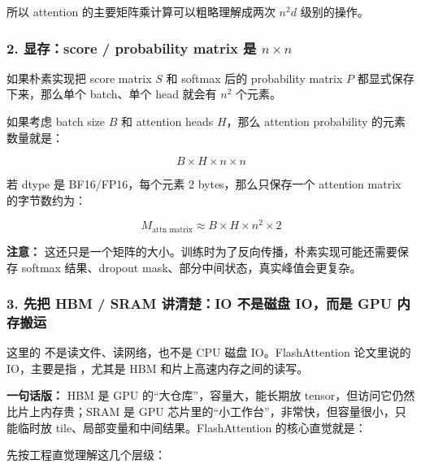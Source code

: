 所以 attention 的主要矩阵乘计算可以粗略理解成两次 $n^2d$ 级别的操作。

\subsubsection*{2. 显存：score / probability matrix 是 $n \times n$}

如果朴素实现把 score matrix $S$ 和 softmax 后的 probability matrix $P$ 都显式保存下来，那么单个 batch、单个 head 就会有 $n^2$ 个元素。

如果考虑 batch size $B$ 和 attention heads $H$，那么 attention probability 的元素数量就是：

\[
B \times H \times n \times n
\]

若 dtype 是 BF16/FP16，每个元素 2 bytes，那么只保存一个 attention matrix 的字节数约为：

\[
M_{\text{attn matrix}}
\approx
B \times H \times n^2 \times 2
\]

\begin{warnbox}
\textbf{注意：} 这还只是一个矩阵的大小。训练时为了反向传播，朴素实现可能还需要保存 softmax 结果、dropout mask、部分中间状态，真实峰值会更复杂。
\end{warnbox}

\subsubsection*{3. 先把 HBM / SRAM 讲清楚：IO 不是磁盘 IO，而是 GPU 内存搬运}

这里的  不是读文件、读网络，也不是 CPU 磁盘 IO。FlashAttention 论文里说的 IO，主要是指 ，尤其是 HBM 和片上高速内存之间的读写。

\begin{conceptbox}
\textbf{一句话版：} HBM 是 GPU 的“大仓库”，容量大，能长期放 tensor，但访问它仍然比片上内存贵；SRAM 是 GPU 芯片里的“小工作台”，非常快，但容量很小，只能临时放 tile、局部变量和中间结果。FlashAttention 的核心直觉就是：
\end{conceptbox}

先按工程直觉理解这几个层级：

